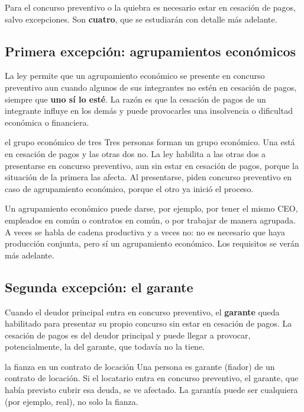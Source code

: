 \documentclass[12pt,oneside]{book}
\begin{document}
Para el concurso preventivo o la quiebra es necesario estar en cesación de pagos, salvo excepciones. Son \textbf{cuatro}, que se estudiarán con detalle más adelante.

\subsection{Primera excepción: agrupamientos económicos}

La ley permite que un agrupamiento económico se presente en concurso preventivo aun cuando algunos de sus integrantes no estén en cesación de pagos, siempre que \textbf{uno sí lo esté}. La razón es que la cesación de pagos de un integrante influye en los demás y puede provocarles una insolvencia o dificultad económica o financiera.

\begin{example}{el grupo económico de tres}
Tres personas forman un grupo económico. Una está en cesación de pagos y las otras dos no. La ley habilita a las otras dos a presentarse en concurso preventivo, aun sin estar en cesación de pagos, porque la situación de la primera las afecta. Al presentarse, piden concurso preventivo en caso de agrupamiento económico, porque el otro ya inició el proceso.
\end{example}

Un agrupamiento económico puede darse, por ejemplo, por tener el mismo CEO, empleados en común o contratos en común, o por trabajar de manera agrupada. A veces se habla de cadena productiva y a veces no: no es necesario que haya producción conjunta, pero sí un agrupamiento económico. Los requisitos se verán más adelante.

\subsection{Segunda excepción: el garante}

Cuando el deudor principal entra en concurso preventivo, el \textbf{garante} queda habilitado para presentar su propio concurso sin estar en cesación de pagos. La cesación de pagos es del deudor principal y puede llegar a provocar, potencialmente, la del garante, que todavía no la tiene.

\begin{example}{la fianza en un contrato de locación}
Una persona es garante (fiador) de un contrato de locación. Si el locatario entra en concurso preventivo, el garante, que había previsto cubrir esa deuda, se ve afectado. La garantía puede ser cualquiera (por ejemplo, real), no solo la fianza.
\end{example}
\end{document}
